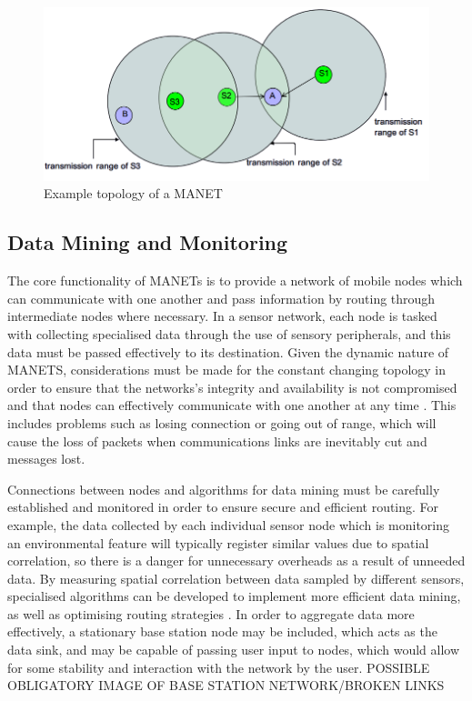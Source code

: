 \begin{figure}
\centering	
\includegraphics[scale=0.7]{img/manet}	
\caption{Example topology of a MANET}
\end{figure}

\subsection{Data Mining and Monitoring}
The core functionality of MANETs is to provide a network of mobile nodes which can communicate with one another and pass information by routing through intermediate nodes where necessary. In a sensor network, each node is tasked with collecting specialised data through the use of sensory peripherals, and this data must be passed effectively to its destination. Given the dynamic nature of MANETS, considerations must be made for the constant changing topology in order to ensure that the networks's integrity and availability is not compromised and that nodes can effectively communicate with one another at any time \cite{ramramathanjasonredi2012}. This includes problems such as losing connection or going out of range, which will cause the loss of packets when communications links are inevitably cut and messages lost. 

Connections between nodes and algorithms for data mining must be carefully established and monitored in order to ensure secure and efficient routing. For example, the data collected by each individual sensor node which is monitoring an environmental feature will typically register similar values due to spatial correlation, so there is a danger for unnecessary overheads as a result of unneeded data. By measuring spatial correlation between data sampled by different sensors, specialised algorithms can be developed to implement more efficient data mining, as well as optimising routing strategies \cite{mayajie2011}. In order to aggregate data more effectively, a  stationary base station node may be included, which acts as the data sink, and may be capable of passing user input to nodes, which would allow for some stability and interaction with the network by the user. 
POSSIBLE OBLIGATORY IMAGE OF BASE STATION NETWORK/BROKEN LINKS

